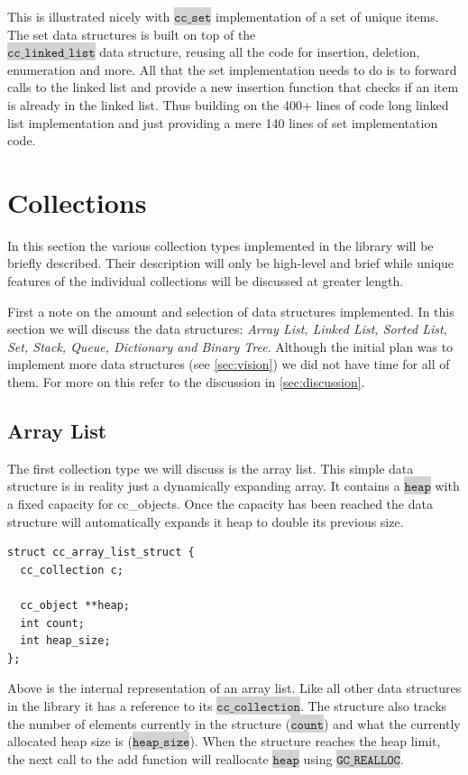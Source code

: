 \documentclass[table]{ituthesis}
\newcommand{\highlight}[1]{\colorbox{lightGray}{$\displaystyle \texttt{#1}$}}
\begin{document}
This is illustrated nicely with \highlight{cc\_set} implementation of a set of unique items. The set data structures is built on top of the \\\highlight{cc\_linked\_list} data structure, reusing all the code for insertion, deletion, enumeration and more. All that the set implementation needs to do is to forward calls to the linked list and provide a new insertion function that checks if an item is already in the linked list. Thus building on the 400+ lines of code long linked list implementation and just providing a mere 140 lines of set implementation code.

\section{Collections}\label{sec:impl_collections}
	In this section the various collection types implemented in the library will be briefly described. Their description will only be high-level and brief while unique features of the individual collections will be discussed at greater length.

	First a note on the amount and selection of data structures implemented. In this section we will discuss the data structures: \textit{Array List, Linked List, Sorted List, Set, Stack, Queue, Dictionary and Binary Tree}. Although the initial plan was to implement more data structures (see \autoref{sec:vision}) we did not have time for all of them. For more on this refer to the discussion in \autoref{sec:discussion}.

	\subsection{Array List}\label{sec:array_list}
	
	The first collection type we will discuss is the array list. This simple data structure is in reality just a dynamically expanding array. It contains a \highlight{heap} with a fixed capacity for cc\_objects. Once the capacity has been reached the data structure will automatically expands it heap to double its previous size.

\begin{lstlisting}[label=cc_array_list-struct,caption=Internal representation of Array List]
struct cc_array_list_struct {
  cc_collection c;

  cc_object **heap;
  int count;
  int heap_size;
};
\end{lstlisting}

	Above is the internal representation of an array list. Like all other data structures in the library it has a reference to its \highlight{cc\_collection}. The structure also tracks the number of elements currently in the structure (\highlight{count}) and what the currently allocated heap size is (\highlight{heap\_size}). When the structure reaches the heap limit, the next call to the add function will reallocate \highlight{heap} using \highlight{GC\_REALLOC}.
\end{document}
